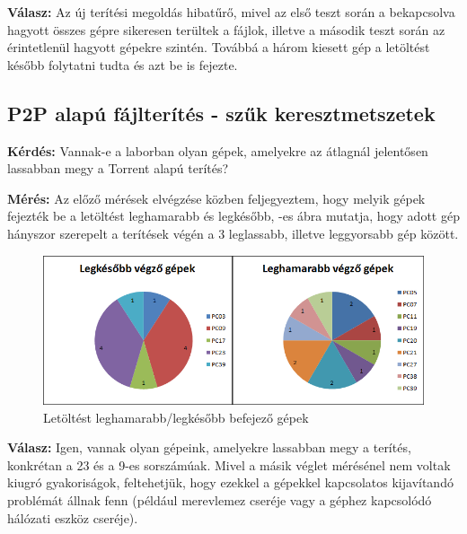 \textbf{Válasz:} Az új terítési megoldás hibatűrő, mivel az első teszt során a bekapcsolva hagyott összes gépre sikeresen terültek a fájlok, illetve a második teszt során az érintetlenül hagyott gépekre szintén. Továbbá a három kiesett gép a letöltést később folytatni tudta és azt be is fejezte.


%
\subsection{P2P alapú fájlterítés - szűk keresztmetszetek}
%

\textbf{Kérdés:} Vannak-e a laborban olyan gépek, amelyekre az átlagnál jelentősen lassabban megy a Torrent alapú terítés?

\textbf{Mérés:} Az előző mérések elvégzése közben feljegyeztem, hogy melyik gépek fejezték be a letöltést leghamarabb és legkésőbb, -es ábra mutatja, hogy adott gép hányszor szerepelt a terítések végén a 3 leglassabb, illetve leggyorsabb gép között.

\begin{figure}[ht]
\centering
\includegraphics[width=150mm, keepaspectratio]{figures/Perf_computers.png}
\caption{Letöltést leghamarabb/legkésőbb befejező gépek}
\label{fig:computerdownloadspeeds}
\end{figure}

\textbf{Válasz:} Igen, vannak olyan gépeink, amelyekre lassabban megy a terítés, konkrétan a 23 és a 9-es sorszámúak. Mivel a másik véglet mérésénel nem voltak kiugró gyakoriságok, feltehetjük, hogy ezekkel a gépekkel kapcsolatos kijavítandó problémát állnak fenn (például merevlemez cseréje vagy a géphez kapcsolódó hálózati eszköz cseréje).


